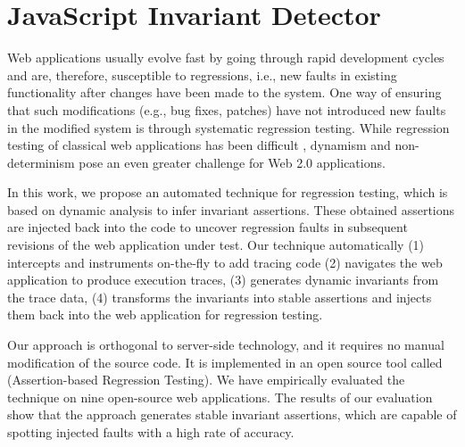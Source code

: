 \chapter{JavaScript Invariant Detector}
\label{Sec:jsart}
Web applications usually evolve fast by going through rapid development cycles and are, therefore, susceptible to regressions, i.e., new faults in existing functionality after changes have been made to the system. One way of ensuring that such modifications (e.g., bug fixes, patches) have not introduced new faults in the modified system is through systematic regression testing.
While regression testing of classical web applications
has been difficult \cite{tarhini:reg08}, dynamism and non-determinism pose an even greater challenge \cite{Roest:2010.icst} for Web 2.0 applications.

In this work, we propose an automated technique for \javascript regression testing, which is based on dynamic analysis to infer invariant assertions. These obtained assertions are injected back into the \javascript code to uncover regression faults in subsequent revisions of the web application under test. 
Our technique automatically (1) intercepts and instruments \javascript on-the-fly to add tracing code (2) navigates the web application to produce execution traces, (3) generates dynamic invariants from the trace data, (4) transforms the invariants into stable assertions and injects them back into the web application for regression testing.

Our approach is orthogonal to server-side technology, and it requires no manual modification of the source code. It is implemented in an open source tool called \jsart (\javascript Assertion-based Regression Testing).  We have empirically
evaluated the technique on nine open-source web applications. The results of our evaluation show that the approach generates stable invariant assertions, which are capable of spotting injected faults with a high rate of accuracy.





%
